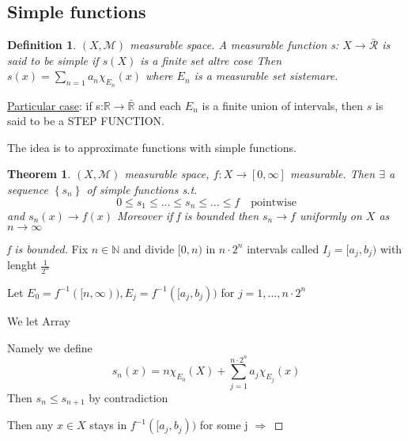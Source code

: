 \documentclass[a4paper,12pt]{article}
\theoremstyle{break}
\newtheorem{theorem}{Theorem}[section]
\newtheorem{definition}{Definition}[section]
\numberwithin{equation}{section}
\begin{document}
\subsection*{Simple functions}
\begin{definition}
    \((X, \mathcal{M})\) measurable space. A measurable function s: \(X \to \bar{\mathcal{R}}\) is said to be simple if \(s(X)\) is a finite set 
    altre cose 
    Then \(s(x) = \sum_{n = 1} a_n \chi_{E_n}(x)\) where \(E_n\) is a measurable set 
    sistemare. 
\end{definition}
\underline{Particular case}: if s:\(\mathbb{R} \to \bar{\mathbb{R}}\) and each \(E_n\) is a finite union of intervals, then \(s\) is said to be a STEP FUNCTION.

The idea is to approximate functions with simple functions.
\begin{theorem}
    \((X,\mathcal{M})\) measurable space, \(f: X \to [0, \infty]\) measurable. Then \(\exists\) a sequence \(\left\lbrace s_n \right\rbrace\) of simple functions s.t. 
    \[
        0 \leq s_1 \leq \ldots \leq s_n \leq \ldots \leq f \quad \mbox{pointwise}
    \]
    and \(s_n(x) \to f(x)\)
Moreover if f is bounded then \(s_n \to f\) uniformly on \(X\) as \(n \to \infty\)
\end{theorem}
\begin{proof}[f is bounded]
    Fix \(n \in \mathbb{N}\) and divide \([0,n)\) in \(n \cdot 2^n\) intervals called \(I_j = [a_j,b_j)\) with lenght \(\frac{1}{2^n}\)

    Let \(E_0 = f^{-1}([n, \infty)), E_j = f^{-1}([a_j, b_j))\) for \(j = 1, \ldots, n\cdot 2^n\)
    
    We let Array

    Namely we define 
    \[
    s_n (x) = n\chi_{E_0}(X) + \sum_{j =1}^{n \cdot 2^n} a_j \chi_{E_j}(x)    
    \]
    Then \(s_n \leq s_{n+1}\) by contradiction

    Then any \(x \in X\) stays in \(f^{-1}([a_j, b_j))\) for some j \(\Longrightarrow \) 
\end{proof}
\end{document}
